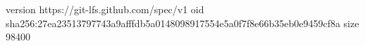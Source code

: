 version https://git-lfs.github.com/spec/v1
oid sha256:27ea23513797743a9afffdb5a0148098917554e5a0f7f8e66b35eb0e9459cf8a
size 98400
